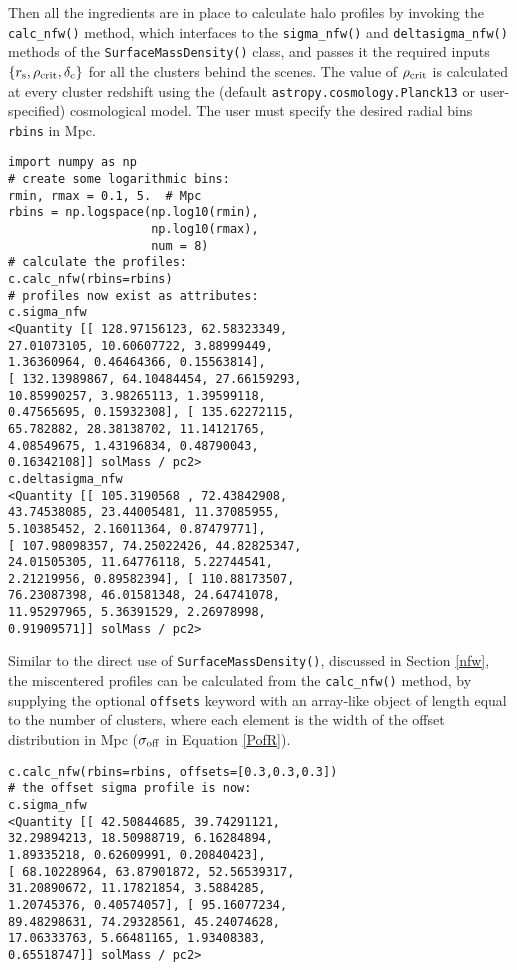 \documentclass[twocolumn]{aastex6}
\newcommand{\code}{\lstinline[style=codeintext]}
\begin{document}
Then all the ingredients are in place to calculate halo profiles by invoking the \code{calc_nfw()} method, which interfaces to the \code{sigma_nfw()} and \code{deltasigma_nfw()} methods of the \code{SurfaceMassDensity()} class, and passes it the required inputs $\{ r_{\rm s}, \rho_{\rm crit}, \delta_{\rm c} \}$ for all the clusters behind the scenes. The value of $\rho_{\rm crit}$ is calculated at every cluster redshift using the (default \code{astropy.cosmology.Planck13} or user-specified) cosmological model. The user must specify the desired radial bins \code{rbins} in Mpc.
\begin{lstlisting}
import numpy as np
# create some logarithmic bins:
rmin, rmax = 0.1, 5.  # Mpc
rbins = np.logspace(np.log10(rmin), 
                    np.log10(rmax), 
                    num = 8)
# calculate the profiles:
c.calc_nfw(rbins=rbins)
# profiles now exist as attributes:
c.sigma_nfw
<Quantity [[ 128.97156123, 62.58323349, 
27.01073105, 10.60607722, 3.88999449, 
1.36360964, 0.46464366, 0.15563814], 
[ 132.13989867, 64.10484454, 27.66159293, 
10.85990257, 3.98265113, 1.39599118, 
0.47565695, 0.15932308], [ 135.62272115, 
65.782882, 28.38138702, 11.14121765, 
4.08549675, 1.43196834, 0.48790043, 
0.16342108]] solMass / pc2>
c.deltasigma_nfw
<Quantity [[ 105.3190568 , 72.43842908, 
43.74538085, 23.44005481, 11.37085955, 
5.10385452, 2.16011364, 0.87479771], 
[ 107.98098357, 74.25022426, 44.82825347, 
24.01505305, 11.64776118, 5.22744541, 
2.21219956, 0.89582394], [ 110.88173507, 
76.23087398, 46.01581348, 24.64741078, 
11.95297965, 5.36391529, 2.26978998, 
0.91909571]] solMass / pc2>
\end{lstlisting}

Similar to the direct use of \code{SurfaceMassDensity()}, discussed in Section \ref{nfw}, the miscentered profiles can be calculated from the \code{calc_nfw()} method, by supplying the optional \code{offsets} keyword with an array-like object of length equal to the number of clusters, where each element is the width of the offset distribution in Mpc ($\sigma_{\rm off}$ in Equation \ref{PofR}).
\begin{lstlisting}
c.calc_nfw(rbins=rbins, offsets=[0.3,0.3,0.3])
# the offset sigma profile is now:
c.sigma_nfw
<Quantity [[ 42.50844685, 39.74291121, 
32.29894213, 18.50988719, 6.16284894, 
1.89335218, 0.62609991, 0.20840423], 
[ 68.10228964, 63.87901872, 52.56539317, 
31.20890672, 11.17821854, 3.5884285, 
1.20745376, 0.40574057], [ 95.16077234, 
89.48298631, 74.29328561, 45.24074628, 
17.06333763, 5.66481165, 1.93408383, 
0.65518747]] solMass / pc2>
\end{lstlisting}
\end{document}
